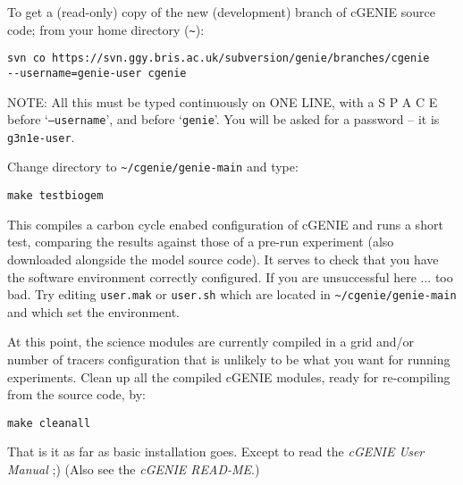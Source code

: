 \documentclass[10pt,twoside]{article}
\begin{document}
\begin{compactenum}
\item	To get a (read-only) copy of the new (development) branch of cGENIE source code; from your home directory (\texttt{\~{}}):
\vspace{-5pt}\begin{verbatim}
svn co https://svn.ggy.bris.ac.uk/subversion/genie/branches/cgenie
--username=genie-user cgenie
\end{verbatim}\vspace{-5pt}
NOTE: All this must be typed continuously on ONE LINE, with a S P A C E before `\texttt{--username}', and before `\texttt{genie}'.
You will be asked for a password -- it is \texttt{g3n1e-user}.
		
\item	Change directory to \texttt{\~{}/cgenie/genie-main} and type:
\vspace{-5pt}\begin{verbatim}
make testbiogem
\end{verbatim}\vspace{-5pt}
This compiles a carbon cycle enabed configuration of cGENIE and runs a short test, comparing the results against those of a pre-run experiment (also downloaded alongside the model source code). It serves to check that you have the software environment correctly configured. If you are unsuccessful here ... too bad. Try editing \texttt{user.mak} or \texttt{user.sh} which are located in \texttt{\~{}/cgenie/genie-main} and which set the environment.

\item	At this point, the science modules are currently compiled in a grid and/or number of tracers configuration that is unlikely to be what you want for running experiments. Clean up all the compiled cGENIE modules, ready for re-compiling from the source code, by:
\vspace{-5pt}\begin{verbatim}
make cleanall
\end{verbatim}\vspace{-5pt}

That is it as far as basic installation goes. Except to read the \textit{cGENIE User Manual} ;)
(Also see the \textit{cGENIE READ-ME}.)
  
\end{compactenum}


\end{document}
